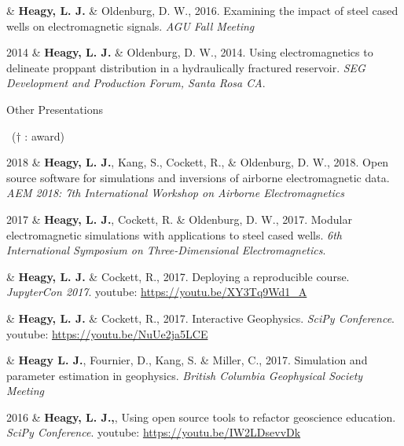 \documentclass[a4paper, 11pt]{article}
\newcommand{\youtube}[1]{youtube: \href{https://youtu.be/XY3Tq9Wd1\_A}{#1}}
\newcommand{\subheading}[1]{
    \vspace{0.5cm}
    {\Large #1}\\
    \vspace{-0.2cm}
}
\begin{document}
\begin{entryright}
& \textbf{Heagy, L. J.} \& Oldenburg, D. W., 2016. Examining the impact of steel cased wells on electromagnetic signals. \emph{AGU Fall Meeting}
\end{entryright}


\begin{entryright}
2014 & \textbf{Heagy, L. J.} \& Oldenburg, D. W., 2014. Using electromagnetics to delineate proppant distribution in a hydraulically fractured reservoir. \emph{SEG Development and Production Forum, Santa Rosa CA}.
\end{entryright}

\subheading{Other Presentations}
\vspace{0.3cm}
~($\dagger$ : award)
\vspace{0.3cm}
\begin{entryright}
2018 & \textbf{Heagy, L. J.}, Kang, S., Cockett, R., \& Oldenburg, D. W., 2018. Open source software for simulations and inversions of airborne electromagnetic data. \emph{AEM 2018: 7th International Workshop on Airborne Electromagnetics}
\end{entryright}

\begin{entryright}
2017 & \textbf{Heagy, L. J.}, Cockett, R. \& Oldenburg, D. W., 2017. Modular electromagnetic simulations with applications to steel cased wells. \emph{6th International Symposium on Three-Dimensional Electromagnetics}.
\end{entryright}

\begin{entryright}
& \textbf{Heagy, L. J.} \& Cockett, R., 2017. Deploying a reproducible course. \emph{JupyterCon 2017}. \youtube{https://youtu.be/XY3Tq9Wd1\_A}
\end{entryright}

\begin{entryright}
& \textbf{Heagy, L. J.} \& Cockett, R., 2017. Interactive Geophysics. \emph{SciPy Conference}. \youtube{https://youtu.be/NuUe2ja5LCE}
\end{entryright}

\begin{entryright}
& \textbf{Heagy L. J.}, Fournier, D., Kang, S. \& Miller, C., 2017. Simulation and parameter estimation in geophysics. \emph{British Columbia Geophysical Society Meeting}
\end{entryright}

\begin{entryright}
2016 & \textbf{Heagy, L. J.,},  Using open source tools to refactor geoscience education. \emph{SciPy Conference}. \youtube{https://youtu.be/IW2LDsevvDk}
\end{entryright}
\end{document}
